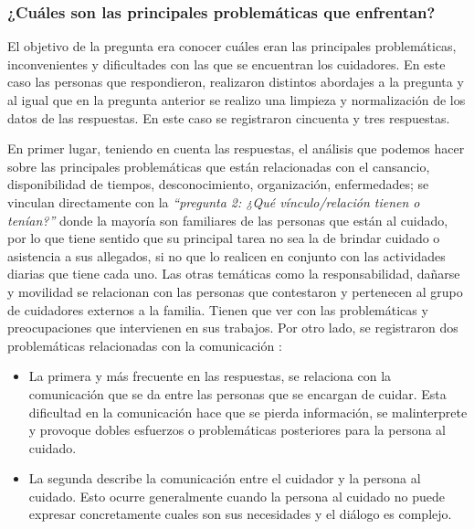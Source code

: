 \documentclass[a4paper,12pt]{article}
\begin{document}
    \subsubsection{¿Cuáles son las principales problemáticas que enfrentan?}
    El objetivo de la pregunta era conocer cuáles eran las principales problemáticas, inconvenientes y dificultades con las que se encuentran los cuidadores. \newline
    En este caso las personas que respondieron, realizaron distintos abordajes a la pregunta y al igual que en la pregunta anterior se realizo una limpieza y normalización de los datos de las respuestas. En este caso se registraron cincuenta y tres respuestas. \newline
         \newline
    En primer lugar, teniendo en cuenta las respuestas, el análisis que podemos hacer sobre las principales problemáticas que están relacionadas con el cansancio, disponibilidad de tiempos, desconocimiento, organización, enfermedades; se vinculan directamente con la \textit{“pregunta 2: ¿Qué vínculo/relación tienen o tenían?”} donde la mayoría son familiares de las personas que están al cuidado, por lo que tiene sentido que su principal tarea no sea la de brindar cuidado o asistencia a sus allegados, si no que lo realicen en conjunto con las actividades diarias que tiene cada uno. \newline
    Las otras temáticas como la responsabilidad, dañarse y movilidad se relacionan con las personas que contestaron y pertenecen al grupo de cuidadores externos a la familia. Tienen que ver con las problemáticas y preocupaciones que intervienen en sus trabajos. \newline
    Por otro lado, se registraron dos problemáticas relacionadas con la comunicación :
    \begin{itemize}
        \item La primera y más frecuente en las respuestas, se relaciona con la comunicación que se da entre las personas que se encargan de cuidar. Esta dificultad en la comunicación hace que se pierda información, se malinterprete y provoque dobles esfuerzos o problemáticas posteriores para la persona al cuidado.
        \item La segunda describe la comunicación entre el cuidador y la persona al cuidado. Esto ocurre generalmente cuando la persona al cuidado no puede expresar concretamente cuales son sus necesidades y el diálogo es complejo.
    \end{itemize}
\end{document}
